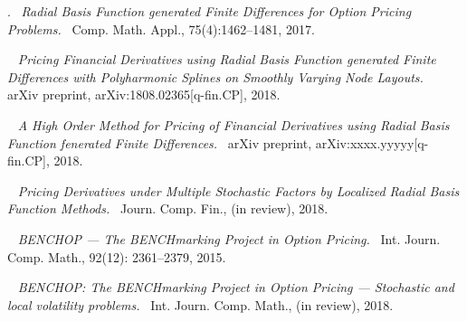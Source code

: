 \documentclass{UUThesisTemplate}
\begin{document}
\frontmatter
    \frontmatterCS

   \dedication{``These violent delights have violent ends''\\(Romeo and Juliet: Act 2, Scene 6, Line 9)}

    \begin{listofpapers}
    \item
    .\ %
    \emph{Radial Basis Function generated Finite Differences for Option Pricing Problems.}\ %
    Comp. Math. Appl., 75(4):1462--1481, 2017. \label{paper1} %
    \item
    \ %
    \emph{Pricing Financial Derivatives using Radial Basis Function generated Finite Differences with Polyharmonic Splines on Smoothly Varying Node Layouts.}\ %
    arXiv preprint, arXiv:1808.02365[q-fin.CP], 2018. \label{paper2} %
    \item
    \ %
    \emph{A High Order Method for Pricing of Financial Derivatives using Radial Basis Function fenerated Finite Differences.}\ %
    arXiv preprint, arXiv:xxxx.yyyyy[q-fin.CP], 2018. \label{paper3} %
    \item
    \ %
    \emph{Pricing Derivatives under Multiple Stochastic Factors by Localized Radial Basis Function Methods.}\ %
    Journ. Comp. Fin., (in review), 2018. \label{paper4} %
    \item
    \ %
    \emph{BENCHOP --- The BENCHmarking Project in Option Pricing.}\ %
    Int. Journ. Comp. Math., 92(12): 2361--2379, 2015. \label{paper5}
    \item
    \ %
    \emph{BENCHOP: The BENCHmarking Project in Option Pricing --- Stochastic and local volatility problems.}\ %
    Int. Journ. Comp. Math., (in review), 2018. \label{paper6}
    \end{listofpapers}
	
\end{document}
